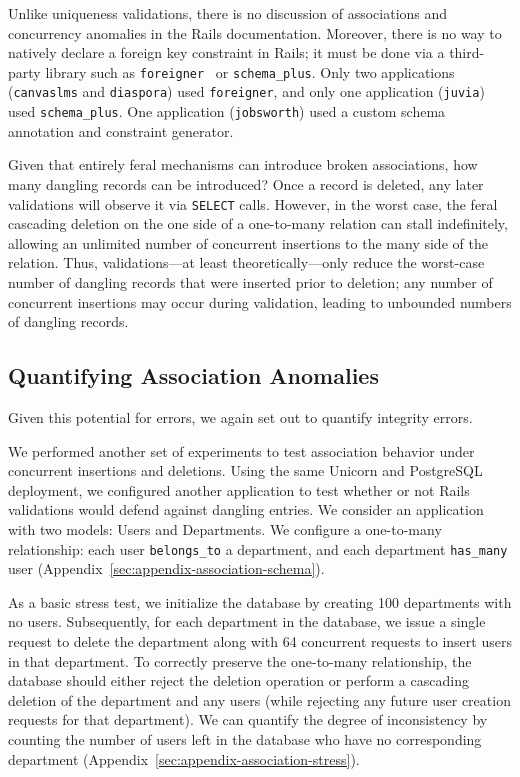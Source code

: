 Unlike uniqueness validations, there is no discussion of associations
and concurrency anomalies in the Rails documentation. Moreover, there
is no way to natively declare a foreign key constraint in Rails; it
must be done via a third-party library such as
\texttt{foreigner}~\cite{foreigner} or
\texttt{schema\_plus}\cite{schemaplus}. Only two applications
(\texttt{canvaslms} and \texttt{diaspora}) used \texttt{foreigner},
and only one application (\texttt{juvia}) used \texttt{schema\_plus}. One
application (\texttt{jobsworth}) used a custom schema annotation and
constraint generator.

 Given that entirely
feral mechanisms can introduce broken associations, how many dangling
records can be introduced? Once a record is deleted, any later
validations will observe it via \texttt{SELECT} calls. However, in the
worst case, the feral cascading deletion on the one side of a
one-to-many relation can stall indefinitely, allowing an unlimited
number of concurrent insertions to the many side of the
relation. Thus, validations---at least theoretically---only reduce the
worst-case number of dangling records that were inserted prior to
deletion; any number of concurrent insertions may occur during
validation, leading to unbounded numbers of dangling records.

\subsection{Quantifying Association Anomalies}

Given this potential for errors, we again set out to quantify
integrity errors. 

We performed another set of experiments to test association behavior
under concurrent insertions and deletions. Using the same Unicorn and
PostgreSQL deployment, we configured another application to test
whether or not Rails validations would defend against dangling
entries. We consider an application with two models: Users and
Departments. We configure a one-to-many relationship: each user
\texttt{belongs\_to} a department, and each department
\texttt{has\_many} user
(Appendix~\ref{sec:appendix-association-schema}).

As a basic stress test, we initialize the database by creating 100
departments with no users. Subsequently, for each department in the
database, we issue a single request to delete the department along
with 64 concurrent requests to insert users in that department. To
correctly preserve the one-to-many relationship, the database should
either reject the deletion operation or perform a cascading deletion
of the department and any users (while rejecting any future user
creation requests for that department). We can quantify the degree of
inconsistency by counting the number of users left in the database who
have no corresponding department (Appendix~\ref{sec:appendix-association-stress}).

